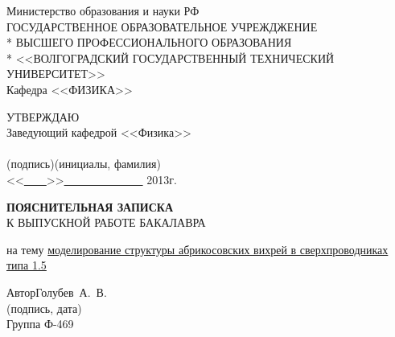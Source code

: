 \begin{titlepage}
	\begin{center}
		Министерство образования и науки РФ \\
		\vspace{.5cm}
		ГОСУДАРСТВЕННОЕ ОБРАЗОВАТЕЛЬНОЕ УЧРЕЖДЖЕНИЕ\\*
		ВЫСШЕГО ПРОФЕССИОНАЛЬНОГО ОБРАЗОВАНИЯ\\*
		<<ВОЛГОГРАДСКИЙ ГОСУДАРСТВЕННЫЙ ТЕХНИЧЕСКИЙ УНИВЕРСИТЕТ>>\\
		\vspace{.5cm}
		Кафедра <<ФИЗИКА>>
		\vspace{.5cm}
	\end{center}
\begin{flushright}
	УТВЕРЖДАЮ\\
	Заведующий кафедрой <<Физика>>\\
	\vspace{.3cm}
	\underline{\hspace{2cm}}\hspace{1cm}\underline{\hspace{4cm}}\\
	\vspace{-.2cm}\footnotesize(подпись)\hspace{1.8cm}(инициалы, фамилия)
		\hspace*{.2cm}\ \normalsize\\
	\vspace{.3cm}
	<<\underline{\ \ \ \ }>>\underline{\ \ \ \ \ \ \ \ \ \ \ \ \ \ } 2013г.
\end{flushright}
\begin{center}
	\LARGE \textbf{ПОЯСНИТЕЛЬНАЯ ЗАПИСКА} \\
	\large К ВЫПУСКНОЙ РАБОТЕ БАКАЛАВРА
\end{center}
\begin{center}
	на тему \underline{моделирование структуры абрикосовских вихрей в 
		сверхпроводниках типа 1.5}
\end{center}
\begin{flushleft}
	Автор\hspace{.7cm}Голубев~А.~В.\hfill\underline{\hspace{5cm}}\\
	\vspace{-.2cm}\hspace{14cm}\footnotesize(подпись, дата)\normalsize\\
	\vspace{-.5cm}
	Группа Ф-469\\

\end{flushleft}
\end{titlepage}
